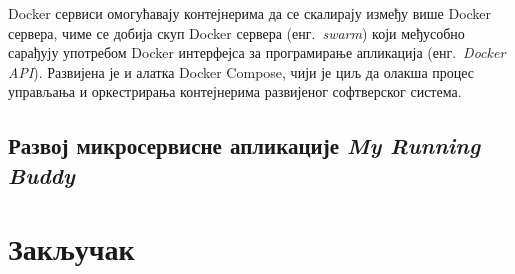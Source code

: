 \documentclass[12pt,oneside]{memoir}
\begin{document}
Docker сервиси омогућавају контејнерима да се скалирају између више Docker сервера, чиме се добија скуп Docker сервера (енг.~\textit{swarm}) који међусобно сарађују употребом Docker интерфејса за програмирање апликација (енг.~\textit{Docker API}). Развијена је и алатка Docker Compose\cite{DockerCompose}, чији је циљ да олакша процес управљања и оркестрирања контејнерима развијеног софтверског система.

\section{Развој микросервисне апликације \textit{My Running Buddy}}

\chapter{Закључак}

\literatura

\end{document}
